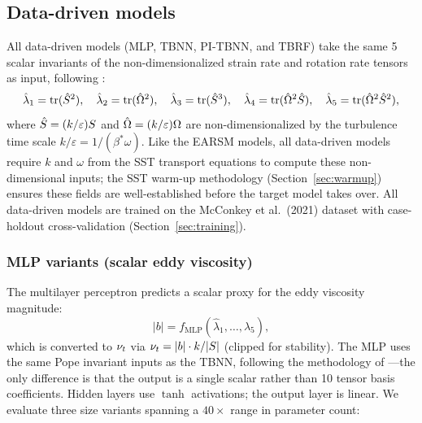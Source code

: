 \subsection{Data-driven models}
\label{sec:nn_models}

All data-driven models (MLP, TBNN, PI-TBNN, and TBRF) take the same 5 scalar invariants of the non-dimensionalized strain rate and rotation rate tensors as input, following \citet{Ling2016}:
\begin{equation}
    \hat{\lambda}_1 = \mathrm{tr}(\hat{S}^2), \quad
    \hat{\lambda}_2 = \mathrm{tr}(\hat{\Omega}^2), \quad
    \hat{\lambda}_3 = \mathrm{tr}(\hat{S}^3), \quad
    \hat{\lambda}_4 = \mathrm{tr}(\hat{\Omega}^2 \hat{S}), \quad
    \hat{\lambda}_5 = \mathrm{tr}(\hat{\Omega}^2 \hat{S}^2),
\end{equation}
where $\hat{S} = (k/\varepsilon) S$ and $\hat{\Omega} = (k/\varepsilon) \Omega$ are non-dimensionalized by the turbulence time scale $k/\varepsilon = 1/(\beta^* \omega)$.
Like the EARSM models, all data-driven models require $k$ and $\omega$ from the SST transport equations to compute these non-dimensional inputs; the SST warm-up methodology (Section~\ref{sec:warmup}) ensures these fields are well-established before the target model takes over.
All data-driven models are trained on the McConkey et al.\ (2021) dataset with case-holdout cross-validation (Section~\ref{sec:training}).

\subsubsection{MLP variants (scalar eddy viscosity)}

The multilayer perceptron predicts a scalar proxy for the eddy viscosity magnitude:
\begin{equation}
    |b| = f_{\mathrm{MLP}}(\hat{\lambda}_1, \ldots, \hat{\lambda}_5),
\end{equation}
which is converted to $\nu_t$ via $\nu_t = |b| \cdot k / |S|$ (clipped for stability).
The MLP uses the same Pope invariant inputs as the TBNN, following the methodology of \citet{Ling2016}---the only difference is that the output is a single scalar rather than 10 tensor basis coefficients.
Hidden layers use $\tanh$ activations; the output layer is linear.
We evaluate three size variants spanning a $40\times$ range in parameter count:

